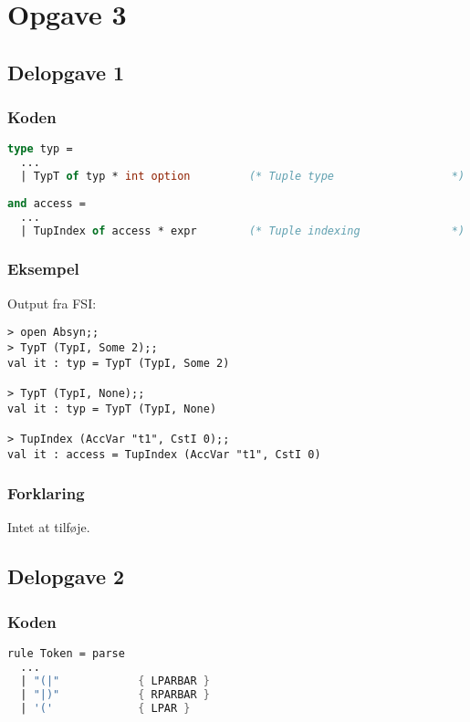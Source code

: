 \section{Opgave 3}
\subsection{Delopgave 1}\label{ass:3-1}
\subsubsection{Koden}
\begin{lstlisting}[language=fsharp]
type typ =
  ...
  | TypT of typ * int option         (* Tuple type                  *)
                                                                   
and access =                                                       
  ...
  | TupIndex of access * expr        (* Tuple indexing              *)
\end{lstlisting}

\subsubsection{Eksempel}
Output fra FSI:
\begin{lstlisting}
> open Absyn;;
> TypT (TypI, Some 2);;
val it : typ = TypT (TypI, Some 2)

> TypT (TypI, None);;
val it : typ = TypT (TypI, None)

> TupIndex (AccVar "t1", CstI 0);;
val it : access = TupIndex (AccVar "t1", CstI 0)
\end{lstlisting}

\subsubsection{Forklaring}
Intet at tilføje.

\subsection{Delopgave 2}\label{ass:3-2}
\subsubsection{Koden}
\begin{lstlisting}[language=fsharp]
rule Token = parse
  ...
  | "(|"            { LPARBAR }  
  | "|)"            { RPARBAR }  
  | '('             { LPAR }
\end{lstlisting}

